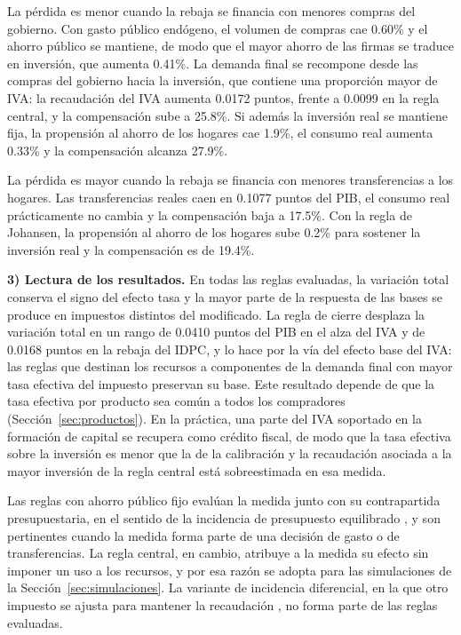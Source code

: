 \documentclass[11pt]{article}
\begin{document}
La pérdida es menor cuando la rebaja se financia con menores compras del gobierno. Con gasto público endógeno, el volumen de compras cae 0.60\% y el ahorro público se mantiene, de modo que el mayor ahorro de las firmas se traduce en inversión, que aumenta 0.41\%. La demanda final se recompone desde las compras del gobierno hacia la inversión, que contiene una proporción mayor de IVA: la recaudación del IVA aumenta 0.0172 puntos, frente a 0.0099 en la regla central, y la compensación sube a 25.8\%. Si además la inversión real se mantiene fija, la propensión al ahorro de los hogares cae 1.9\%, el consumo real aumenta 0.33\% y la compensación alcanza 27.9\%.

La pérdida es mayor cuando la rebaja se financia con menores transferencias a los hogares. Las transferencias reales caen en 0.1077 puntos del PIB, el consumo real prácticamente no cambia y la compensación baja a 17.5\%. Con la regla de Johansen, la propensión al ahorro de los hogares sube 0.2\% para sostener la inversión real y la compensación es de 19.4\%.

\textbf{3) Lectura de los resultados.} En todas las reglas evaluadas, la variación total conserva el signo del efecto tasa y la mayor parte de la respuesta de las bases se produce en impuestos distintos del modificado. La regla de cierre desplaza la variación total en un rango de 0.0410 puntos del PIB en el alza del IVA y de 0.0168 puntos en la rebaja del IDPC, y lo hace por la vía del efecto base del IVA: las reglas que destinan los recursos a componentes de la demanda final con mayor tasa efectiva del impuesto preservan su base. Este resultado depende de que la tasa efectiva por producto sea común a todos los compradores (Sección~\ref{sec:productos}). En la práctica, una parte del IVA soportado en la formación de capital se recupera como crédito fiscal, de modo que la tasa efectiva sobre la inversión es menor que la de la calibración y la recaudación asociada a la mayor inversión de la regla central está sobreestimada en esa medida.

Las reglas con ahorro público fijo evalúan la medida junto con su contrapartida presupuestaria, en el sentido de la incidencia de presupuesto equilibrado \cite{musgrave_1959}, y son pertinentes cuando la medida forma parte de una decisión de gasto o de transferencias. La regla central, en cambio, atribuye a la medida su efecto sin imponer un uso a los recursos, y por esa razón se adopta para las simulaciones de la Sección~\ref{sec:simulaciones}. La variante de incidencia diferencial, en la que otro impuesto se ajusta para mantener la recaudación \cite{shoven_whalley_1977,ballard_fullerton_shoven_whalley_1985}, no forma parte de las reglas evaluadas.
\end{document}
